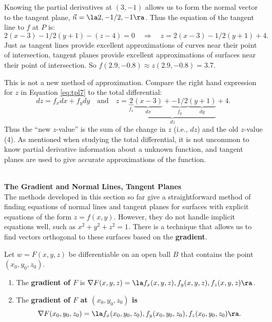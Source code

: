 {Knowing the partial derivatives at $(3,-1)$ allows us to form the normal vector to the tangent plane, $\vec n = \la 2,-1/2,-1\ra$. Thus the equation of the tangent line to $f$ at $P$ is:
\begin{equation}
2(x-3)-1/2(y+1) - (z-4) = 0 \quad \Rightarrow \quad z = 2(x-3)-1/2(y+1)+4.\label{eq:tpl7}\end{equation}
Just as tangent lines provide excellent approximations of curves near their point of intersection, tangent planes provide excellent approximations of surfaces near their point of intersection. So $f(2.9,-0.8) \approx z(2.9,-0.8) = 3.7.$

This is not a new method of approximation. Compare the right hand expression for $z$ in Equation \eqref{eq:tpl7} to the total differential:
$$dz = f_xdx + f_ydy \quad \text{and} \quad z = \underbrace{\underbrace{2}_{f_x}\underbrace{(x-3)}_{dx}+\underbrace{-1/2}_{f_y}\underbrace{(y+1)}_{dy}}_{dz}+4.$$
Thus the ``new $z$-value'' is the sum of the change in $z$ (i.e., $dz$) and the old $z$-value (4). As mentioned when studying the total differential, it is not uncommon to know partial derivative information about a unknown function, and tangent planes are used to give accurate approximations of the function.
}\\

\noindent\textbf{\large The Gradient and Normal Lines, Tangent Planes}\\

The methods developed in this section so far give a straightforward method of finding equations of normal lines and tangent planes for surfaces with explicit equations of the form $z=f(x,y)$. However, they do not handle implicit equations well, such as $x^2+y^2+z^2=1$. There is a technique that allows us to find vectors orthogonal to these surfaces based on the \textbf{gradient}.

{Let $w=F(x,y,z)$ be differentiable on an open ball $B$ that contains the point $(x_0,y_0,z_0)$.
\begin{enumerate}
	\item The \textbf{gradient of $F$} is $\nabla F(x,y,z) = \la f_x(x,y,z),f_y(x,y,z),f_z(x,y,z)\ra$.
	\item The \textbf{gradient of $F$ at $(x_0,y_0,z_0)$ is $$\nabla F(x_0,y_0,z_0) = \la f_x(x_0,y_0,z_0),f_y(x_0,y_0,z_0),f_z(x_0,y_0,z_0)\ra.$$}
\end{enumerate}
\baselineskip
}

